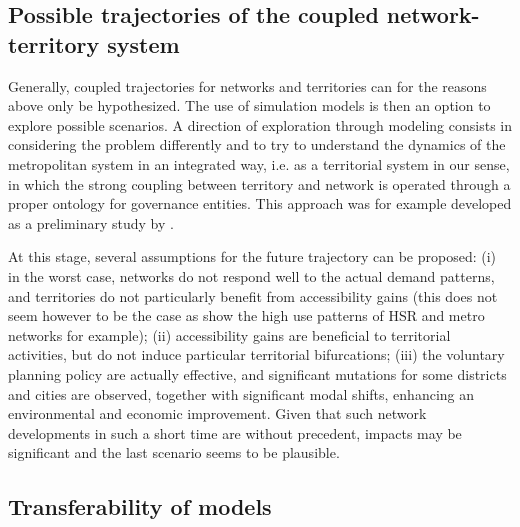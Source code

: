 \subsection{Possible trajectories of the coupled network-territory system}


Generally, coupled trajectories for networks and territories can for the reasons above only be hypothesized. The use of simulation models is then an option to explore possible scenarios. A direction of exploration through modeling consists in considering the problem differently and to try to understand the dynamics of the metropolitan system in an integrated way, i.e. as a territorial system in our sense, in which the strong coupling between territory and network is operated through a proper ontology for governance entities. This approach was for example developed as a preliminary study by \cite{le2015modeling}.

At this stage, several assumptions for the future trajectory can be proposed: (i) in the worst case, networks do not respond well to the actual demand patterns, and territories do not particularly benefit from accessibility gains (this does not seem however to be the case as show the high use patterns of HSR and metro networks for example); (ii) accessibility gains are beneficial to territorial activities, but do not induce particular territorial bifurcations; (iii) the voluntary planning policy are actually effective, and significant mutations for some districts and cities are observed, together with significant modal shifts, enhancing an environmental and economic improvement. Given that such network developments in such a short time are without precedent, impacts may be significant and the last scenario seems to be plausible.


\subsection{Transferability of models}

